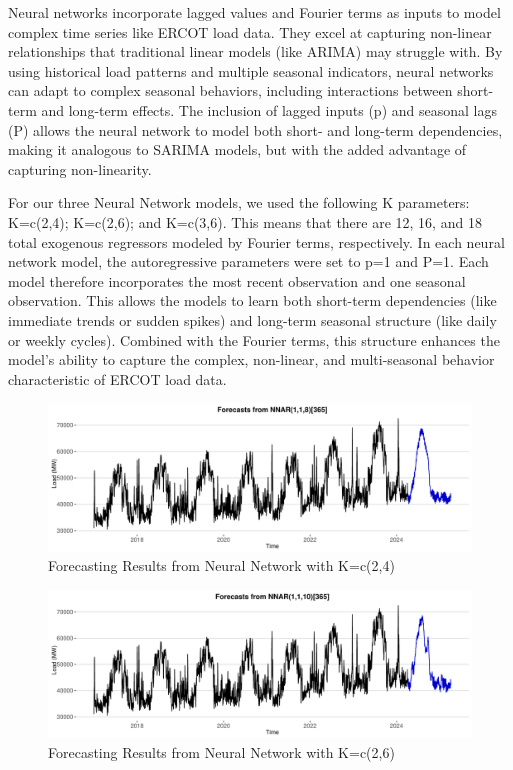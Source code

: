 \documentclass[
]{article}
\begin{document}
Neural networks incorporate lagged values and Fourier terms as inputs to
model complex time series like ERCOT load data. They excel at capturing
non-linear relationships that traditional linear models (like ARIMA) may
struggle with. By using historical load patterns and multiple seasonal
indicators, neural networks can adapt to complex seasonal behaviors,
including interactions between short-term and long-term effects. The
inclusion of lagged inputs (p) and seasonal lags (P) allows the neural
network to model both short- and long-term dependencies, making it
analogous to SARIMA models, but with the added advantage of capturing
non-linearity.

For our three Neural Network models, we used the following K parameters:
K=c(2,4); K=c(2,6); and K=c(3,6). This means that there are 12, 16, and
18 total exogenous regressors modeled by Fourier terms, respectively. In
each neural network model, the autoregressive parameters were set to p=1
and P=1. Each model therefore incorporates the most recent observation
and one seasonal observation. This allows the models to learn both
short-term dependencies (like immediate trends or sudden spikes) and
long-term seasonal structure (like daily or weekly cycles). Combined
with the Fourier terms, this structure enhances the model's ability to
capture the complex, non-linear, and multi-seasonal behavior
characteristic of ERCOT load data.

\begin{figure}
\centering
\includegraphics{FinalProject_Report_files/figure-latex/unnamed-chunk-13-1.pdf}
\caption{Forecasting Results from Neural Network with K=c(2,4)}
\end{figure}

\begin{figure}
\centering
\includegraphics{FinalProject_Report_files/figure-latex/unnamed-chunk-14-1.pdf}
\caption{Forecasting Results from Neural Network with K=c(2,6)}
\end{figure}
\end{document}
